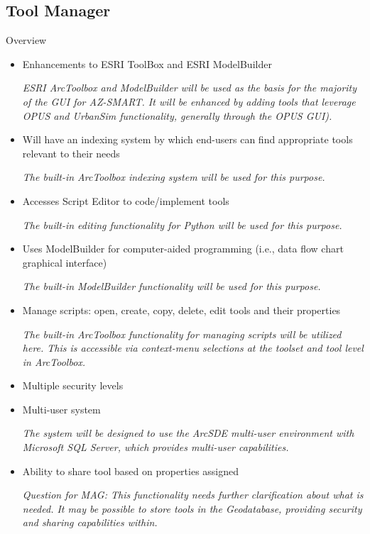 \subsection{Tool Manager}
Overview
\begin{itemize}

\item Enhancements to ESRI ToolBox and ESRI ModelBuilder

\emph{ESRI ArcToolbox and ModelBuilder will be used as the basis for the majority of the GUI for AZ-SMART.  It will be enhanced by adding tools that leverage OPUS and UrbanSim functionality, generally through the OPUS GUI).}

\item Will have an indexing system by which end-users can find appropriate tools relevant to their needs

\emph{The built-in ArcToolbox indexing system will be used for this purpose.}

\item Accesses Script Editor to code/implement tools

\emph{The built-in editing functionality for Python will be used for this purpose.}

\item Uses ModelBuilder for computer-aided programming (i.e., data flow chart graphical interface)

\emph{The built-in ModelBuilder functionality will be used for this purpose.}

\item Manage scripts: open, create, copy, delete, edit tools and their properties

\emph{The built-in ArcToolbox functionality for managing scripts will be utilized here.  This is accessible via context-menu selections at the toolset and tool level in ArcToolbox.}

\item Multiple security levels

\item Multi-user system

\emph{The system will be designed to use the ArcSDE multi-user environment with Microsoft SQL Server, which provides multi-user capabilities.}

\item Ability to share tool based on properties assigned

\emph{Question for MAG: This functionality needs further clarification about what is needed.  It may be possible to store tools in the Geodatabase, providing security and sharing capabilities within.}


\end{itemize}
